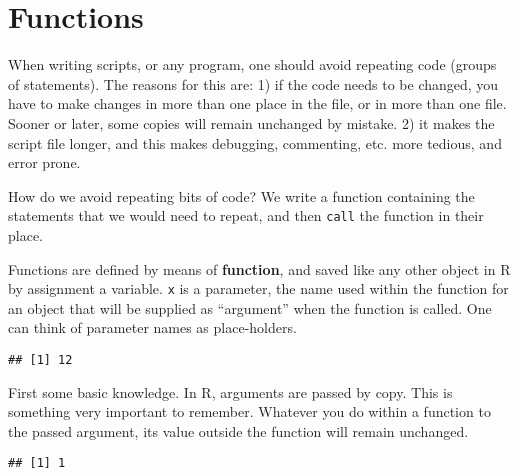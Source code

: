 \documentclass[paper=a4,10pt,div=17,headsepline,BCOR=12mm,twoside,open=right]{scrbook}\usepackage{knitr}
\begin{document}
\section{Functions}

When writing scripts, or any program, one should avoid repeating code (groups of statements). The reasons for this are: 1) if the code needs to be changed, you have to make changes in more than one place in the file, or in more than one file. Sooner or later, some copies will remain unchanged by mistake. 2) it makes the script file longer, and this makes debugging, commenting, etc. more tedious, and error prone.

How do we avoid repeating bits of code? We write a function containing the statements that we would need to repeat, and then \texttt{call} the function in their place.

Functions are defined by means of \textbf{function}, and saved like any other object in R by assignment a variable. \texttt{x} is a parameter, the name used within the function for an object that will be supplied as ``argument'' when the function is called. One can think of parameter names as place-holders.

\begin{knitrout}\footnotesize
{}\color{fgcolor}\begin{kframe}
\begin{alltt}
 \hlkwb{<-} \hlstd{(}\hlstd{,}  \hlopt{*} 
\hlstd{(}\hlstd{,} \hlstd{)}
\end{alltt}
\begin{verbatim}
## [1] 12
\end{verbatim}
\end{kframe}
\end{knitrout}

First some basic knowledge. In R, arguments are passed by copy. This is something very important to remember. Whatever you do within a function to the passed argument, its value outside the function will remain unchanged.

\begin{knitrout}\footnotesize
{}\color{fgcolor}\begin{kframe}
\begin{alltt}
 \hlkwb{<-} \hlstd{(} \hlkwb{<-} \hlstd{\}}
 \hlkwb{<-} 
\end{alltt}
\begin{verbatim}
## [1] 1
\end{verbatim}
\end{kframe}
\end{knitrout}
\end{document}
